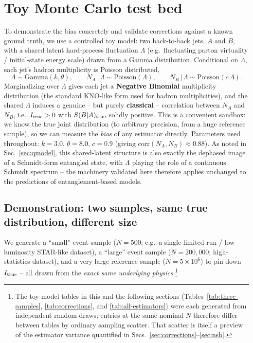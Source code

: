 \documentclass[11pt]{article}
\newcommand{\SBA}{S(B|A)}
\newcommand{\Itrue}{I_{\rm true}}
\begin{document}
\section{Toy Monte Carlo test bed}
\label{sec:toymc}

To demonstrate the bias concretely and validate corrections against a
known ground truth, we use a controlled toy model: two back-to-back jets,
$A$ and $B$, with a shared latent hard-process fluctuation $\Lambda$
(e.g.\ fluctuating parton virtuality / initial-state energy scale) drawn
from a Gamma distribution. Conditional on $\Lambda$, each jet's hadron
multiplicity is Poisson distributed,
\begin{equation}
\Lambda \sim \mathrm{Gamma}(k,\theta), \qquad
N_A\,|\,\Lambda \sim \mathrm{Poisson}(\Lambda), \qquad
N_B\,|\,\Lambda \sim \mathrm{Poisson}(c\,\Lambda).
\end{equation}
Marginalizing over $\Lambda$ gives each jet a \textbf{Negative Binomial}
multiplicity distribution (the standard KNO-like form used for hadron
multiplicities), and the shared $\Lambda$ induces a genuine -- but purely
\textbf{classical} -- correlation between $N_A$ and $N_B$, i.e.\
$\Itrue>0$ with $\SBA_{\rm true}$ solidly positive. This is a convenient
sandbox: we know the true joint distribution (to arbitrary precision,
from a huge reference sample), so we can measure the \emph{bias} of any
estimator directly. Parameters used throughout: $k=3.0$, $\theta=8.0$,
$c=0.9$ (giving $\mathrm{corr}(N_A,N_B)\approx 0.88$). As noted in
Sec.~\ref{sec:qmodel}, this shared-latent structure is also exactly the
dephased image of a Schmidt-form entangled state, with $\Lambda$ playing
the role of a continuous Schmidt spectrum -- the machinery validated
here therefore applies unchanged to the predictions of
entanglement-based models.

\subsection{Demonstration: two samples, same true distribution, different
size}

We generate a ``small'' event sample ($N=500$; e.g.\ a single limited run
/ low-luminosity STAR-like dataset), a ``large'' event sample
($N=200{,}000$; high-statistics dataset), and a very large reference
sample ($N=5\times10^6$) to pin down $\Itrue$ -- all drawn from the
\emph{exact same underlying physics}.\footnote{The toy-model tables in
this and the following sections (Tables~\ref{tab:three-samples},
\ref{tab:corrections}, and \ref{tab:all-estimators}) were each generated
from independent random draws; entries at the same nominal $N$ therefore
differ between tables by ordinary sampling scatter. That scatter is
itself a preview of the estimator variance quantified in
Secs.~\ref{sec:corrections}--\ref{sec:nsb}.}
\end{document}
